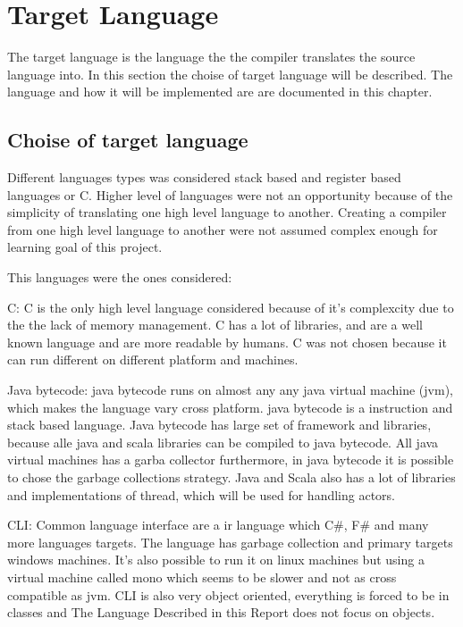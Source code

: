 \section{Target Language}

The target language is the language the the compiler translates the source language into. In this section the choise of target language will be described. The language and how it will be implemented are are documented in this chapter.

\subsection{Choise of target language}

Different languages types was considered stack based and register based languages or C.
Higher level of languages were not an opportunity because of the simplicity of translating one high level language to another. 
Creating a compiler from one high level language to another were not assumed complex enough for learning goal of this project. 

This languages were the ones considered:

C:
C is the only high level language considered because of it's complexcity due to the the lack of memory management. C has a lot of libraries, and are a well known language and are more readable by humans. C was not chosen because it can run different on different platform and machines.

Java bytecode: 
java bytecode runs on almost any any java virtual machine (jvm), which makes the language vary cross platform. java bytecode is a instruction and stack based language. Java bytecode has large set of framework and libraries, because alle java and scala libraries can be compiled to java bytecode. All java virtual machines has a garba collector furthermore, in java bytecode it is possible to chose the garbage collections strategy.
Java and Scala also has a lot of libraries and implementations of thread, which will be used for handling actors.

CLI:
Common language interface are a ir language which C#, F# and many more languages targets. The language has garbage collection and primary targets windows machines.  It’s also possible to run it on linux machines but using a virtual machine called mono which seems to be slower and not as cross compatible as jvm. 
CLI is also very object oriented, everything is forced to be in classes and The Language Described in this Report does not focus on objects. 

